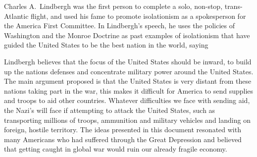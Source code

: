Charles A.\ Lindbergh was the first person to complete a solo, non-stop, trans-Atlantic flight, and used his fame to promote isolationism as a spokesperson for the America First Committee.
In Lindbergh's  speech, he uses the policies of Washington and the Monroe Doctrine as past examples of isolationism that have guided the United States to be the best nation in the world, saying 

Lindbergh believes that the focus of the United States should be inward, to build up the nations defenses and concentrate military power around the United States.
The main argument proposed is that the United States is very distant from these nations taking part in the war, this makes it difficult for America to send supplies and troops to aid other countries.
Whatever difficulties we face with sending aid, the Nazi's will face if attempting to attack the United States, such as transporting millions of troops, ammunition and military vehicles and landing on foreign, hostile territory.
The ideas presented in this document resonated with many Americans who had suffered through the Great Depression and believed that getting caught in global war would ruin our already fragile economy.